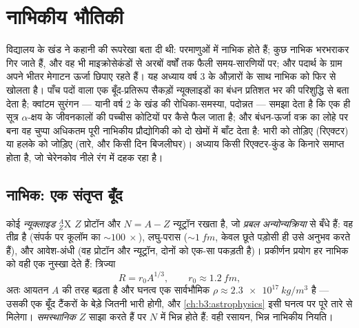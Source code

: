 \chapter{नाभिकीय भौतिकी}\label{ch:b3:nuclear-physics}


विद्यालय के खंड ने कहानी की रूपरेखा बता दी थी: परमाणुओं में नाभिक
होते हैं; कुछ नाभिक भरभराकर गिर जाते हैं, और वह भी माइक्रोसेकंडों से
अरबों वर्षों तक फैली समय-सारणियों पर; और पदार्थ के ग्राम अपने भीतर
मेगाटन ऊर्जा छिपाए रहते हैं। यह अध्याय वर्ष 3 के औज़ारों के साथ नाभिक
को फिर से खोलता है। पाँच पदों वाला एक बूँद-प्रतिरूप सैकड़ों
न्यूक्लाइडों का बंधन प्रतिशत भर की परिशुद्धि से बता देता है; क्वांटम
सुरंगन --- यानी वर्ष 2 के खंड की रोधिका-समस्या, पदोन्नत --- समझा देता
है कि एक ही सूत्र $\alpha$-क्षय के जीवनकालों की पच्चीस कोटियों पर कैसे
फैल जाता है; और बंधन-ऊर्जा वक्र का लोहे पर बना वह चुप्पा अधिकतम पूरी
नाभिकीय प्रौद्योगिकी को दो खेमों में बाँट देता है: भारी को तोड़िए
(रिएक्टर) या हलके को जोड़िए (तारे, और किसी दिन बिजलीघर)। अध्याय किसी
रिएक्टर-कुंड के किनारे समाप्त होता है, जो चेरेनकोव नीले रंग में दहक
रहा है।

\section{नाभिक: एक संतृप्त बूँद}

\begin{definition}[न्यूक्लाइड, आकार, और घनत्व]\label{def:b3:nuclear-physics:nuclide}
कोई \emph{न्यूक्लाइड} $^{A}_{Z}\text{X}$ $Z$ प्रोटॉन और $N = A -
Z$ न्यूट्रॉन रखता है, जो \emph{प्रबल अन्योन्यक्रिया} से बँधे हैं: वह
तीव्र है (संपर्क पर कूलॉम का ${\sim}\qty{100}{}\times$), लघु-परास
(${\sim}\qty{1}{fm}$, केवल छूते पड़ोसी ही उसे अनुभव करते हैं), और
आवेश-अंधी (वह प्रोटॉन और न्यूट्रॉन, दोनों को एक-सा पकड़ती है)।
प्रकीर्णन प्रयोग हर नाभिक को वही एक नुस्खा देते हैं: त्रिज्या
\[
R = r_0A^{1/3} , \qquad r_0 \approx \qty{1.2}{fm} ,
\]
अतः आयतन $A$ की तरह बढ़ता है और घनत्व एक सार्वभौमिक
$\rho \approx \qty{2.3e17}{kg/m^3}$ है --- उसकी एक बूँद
टैंकरों के बेड़े जितनी भारी होगी, और
\cref{ch:b3:astrophysics} इसी घनत्व पर पूरे तारे से मिलेगा।
\emph{समस्थानिक} $Z$ साझा करते हैं पर $N$ में भिन्न होते हैं: वही
रसायन, भिन्न नाभिकीय नियति।
\end{definition}

